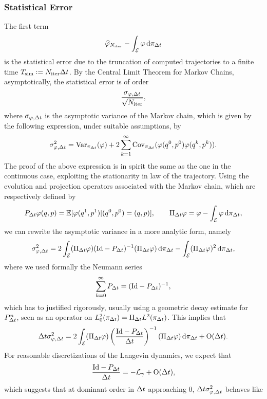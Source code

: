         \subsubsection{Statistical Error}
        The first term
        \[\widehat{\varphi}_{N_{\mathrm{iter}}} - \int_\mathcal{E}\varphi \,\mathrm{d} \pi_{{\Delta t}}\]
        is the statistical error due to the truncation of computed trajectories to a finite time $T_{\mathrm{sim}}\mathrel{\mathop:}= N_{\mathrm{iter}}{\Delta t}$. 
        By the Central Limit Theorem for Markov Chains, asymptotically, the statistical error is of order
        \[\frac{\sigma_{\varphi,{\Delta t}}}{\sqrt{N_{\mathrm{iter}}}},\]
        where $\sigma_{\varphi,{\Delta t}}$ is the asymptotic variance of the Markov chain, which is given by the following expression, under suitable assumptions, by
        \[\sigma_{\varphi,{\Delta t}}^2=\mathrm{Var}_{\pi_{\Delta t}}(\varphi)+2\sum_{k=1}^\infty \mathrm{Cov}_{\pi_{\Delta t}}(\varphi(q^0,p^0)\varphi(q^k,p^k)).\]
        The proof of the above expression is in spirit the same as the one in the continuous case, exploiting the stationarity in law of the trajectory.
        Using the evolution and projection operators associated with the Markov chain, which are respectively defined by
        \begin{equation}
            \label{eq:markov_chain_operators}
            P_{{\Delta t}}\varphi(q,p)=\mathbb{E}[\varphi(q^1,p^1)|(q^0,p^0)=(q,p)],\qquad \Pi_{\Delta t} \varphi=\varphi - \int_{\mathcal E}\varphi \,\mathrm{d} \pi_{{\Delta t}},
        \end{equation}
        we can rewrite the asymptotic variance in a more analytic form, namely
        \begin{equation}
            \label{eq:asymptotic_variance_markov_chain}
            \sigma_{\varphi,{\Delta t}}^2=2\int_{\mathcal E}(\Pi_{{\Delta t}}\varphi)(\mathrm{Id}-P_{\Delta t})^{-1}(\Pi_{\Delta t} \varphi)\,\mathrm{d}\pi_{{\Delta t}}-\int_{\mathcal E}(\Pi_{\Delta t} \varphi)^2\,\mathrm{d} \pi_{\Delta t},
        \end{equation}
        where we used formally the Neumann series
        \[\sum_{k=0}^\infty P_{\Delta t}=(\mathrm{Id}-P_{\Delta t})^{-1},\]
        which has to justified rigorously, usually using a geometric decay estimate for $P_{\Delta t}^n$, seen as an operator on $L^2_0(\pi_{\Delta t})=\Pi_{\Delta t} L^2(\pi_{\Delta t})$.
        This implies that 
        \[{\Delta t}\sigma_{\varphi,{\Delta t}}^2=2\int_{\mathcal E}(\Pi_{{\Delta t}}\varphi)\left(\frac{\mathrm{Id}-P_{\Delta t}}{{\Delta t}}\right)^{-1}(\Pi_{\Delta t} \varphi)\,\mathrm{d}\pi_{{\Delta t}}+\mathrm{O}({\Delta t}).\]
        For reasonable discretizations of the Langevin dynamics, we expect that 
        \[\frac{\mathrm{Id}-P_{\Delta t}}{{\Delta t}}=-\mathcal{L}_\gamma+\mathrm{O}({\Delta t}),\]
        which suggests that at dominant order in ${\Delta t}$ approaching $0$, ${\Delta t}\sigma_{\varphi,{\Delta t}}^2$ behaves like
